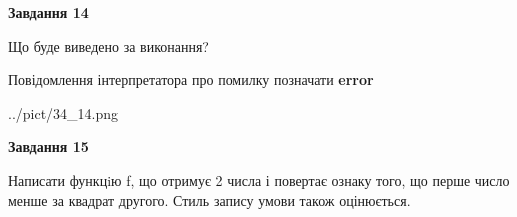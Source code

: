 \documentclass[11pt, ukrainian]{article}
\begin{document}
{\begin {large}
{\begin {center}\textbf{Завдання 14}\end {center}}\par
Що буде виведено за виконання? \par
Повідомлення інтерпретатора про помилку позначати \textbf{error}

\begin{center}
	{../pict/34_14.png}
\end{center}
\newpage

{\begin {center}\textbf{Завдання 15}\end {center}}\par

Написати функцiю f, що отримує 2 числа і повертає ознаку того, що перше число менше за квадрат другого. Стиль запису умови також оцінюється.\par
\newpage

\end {large}}
\end{document}
